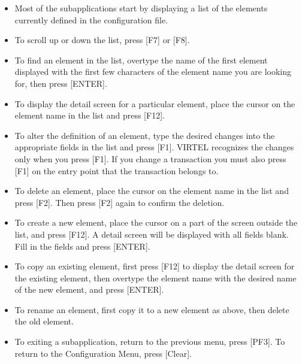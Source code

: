 \documentclass[letterpaper,10pt,english]{sphinxmanual}
\begin{document}
\begin{itemize}
\item {} 
\sphinxAtStartPar
Most of the sub\sphinxhyphen{}applications start by displaying a list of the elements currently defined in the configuration file.

\item {} 
\sphinxAtStartPar
To scroll up or down the list, press {[}F7{]} or {[}F8{]}.

\item {} 
\sphinxAtStartPar
To find an element in the list, overtype the name of the first element displayed with the first few characters of the element name you are looking for, then press {[}ENTER{]}.

\item {} 
\sphinxAtStartPar
To display the detail screen for a particular element, place the cursor on the element name in the list and press {[}F12{]}.

\item {} 
\sphinxAtStartPar
To alter the definition of an element, type the desired changes into the appropriate fields in the list and press {[}F1{]}. VIRTEL recognizes the changes only when you press {[}F1{]}. If you change a transaction you must also press {[}F1{]} on the entry point that the transaction belongs to.

\item {} 
\sphinxAtStartPar
To delete an element, place the cursor on the element name in the list and press {[}F2{]}. Then press {[}F2{]} again to confirm the deletion.

\item {} 
\sphinxAtStartPar
To create a new element, place the cursor on a part of the screen outside the list, and press {[}F12{]}. A detail screen will be displayed with all fields blank. Fill in the fields and press {[}ENTER{]}.

\item {} 
\sphinxAtStartPar
To copy an existing element, first press {[}F12{]} to display the detail screen for the existing element, then overtype the element name with the desired name of the new element, and press {[}ENTER{]}.

\item {} 
\sphinxAtStartPar
To rename an element, first copy it to a new element as above, then delete the old element.

\item {} 
\sphinxAtStartPar
To exiting a sub\sphinxhyphen{}application, return to the previous menu, press {[}PF3{]}. To return to the Configuration Menu, press {[}Clear{]}.

\end{itemize}
\end{document}
